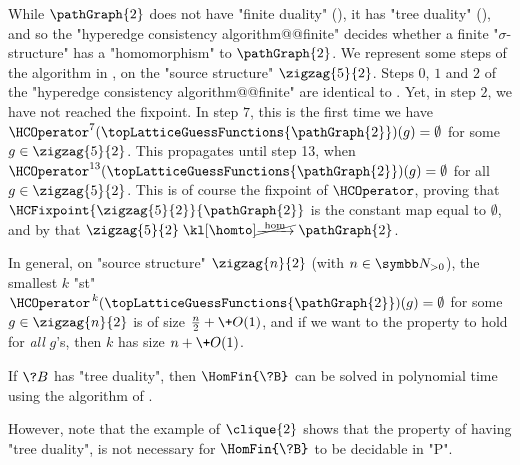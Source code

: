 \begin{example}
	\AP\label{ex:zigzag-HC-P2}
	While $\pathGraph{2}$ does not have "finite duality" (), it has
	"tree duality" (), and so the "hyperedge consistency algorithm@@finite"
	decides whether a finite "$\sigma$-structure" has a "homomorphism" to $\pathGraph{2}$.
	We represent some steps of the algorithm in ,
	on the "source structure" $\zigzag{5}{2}$.
	Steps $0$, $1$ and $2$ of the "hyperedge consistency algorithm@@finite"
	are identical to .
	Yet, in step $2$, we have not reached the fixpoint.
	In step $7$, this is the first time
	we have $\HCOperator^{7}(\topLatticeGuessFunctions{\pathGraph{2}})(g) = \emptyset$ for some
	$g\in \zigzag{5}{2}$. This propagates until step 13, 
	when $\HCOperator^{13}(\topLatticeGuessFunctions{\pathGraph{2}})(g) = \emptyset$
	for all $g\in \zigzag{5}{2}$. This is of course the fixpoint of $\HCOperator$,
	proving that $\HCFixpoint{\zigzag{5}{2}}{\pathGraph{2}}$ is the constant map
	equal to $\emptyset$, and by 
	that $\zigzag{5}{2} \nothomto \pathGraph{2}$.

	In general, on "source structure" $\zigzag{n}{2}$ (with $n\in\Np$),
	the smallest $k$ "st" $\HCOperator^{\,k}(\topLatticeGuessFunctions{\pathGraph{2}})(g) = \emptyset$
	for some $g \in \zigzag{n}{2}$ is of size $\frac{n}{2} + \+O(1)$,
	and if we want to the property to hold for \emph{all} $g$'s,
	then $k$ has size $n + \+O(1)$.
\end{example}

\begin{corollary}
	If $\?B$ has "tree duality", then $\HomFin{\?B}$ can be solved in
	polynomial time using the algorithm of .
\end{corollary}

However, note that the example of $\clique{2}$ shows that the property
of having "tree duality", is not necessary for $\HomFin{\?B}$ to be decidable in "P".

